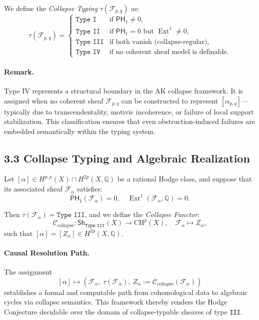 \documentclass[11pt]{article}
\DeclareMathOperator{\Ext}{Ext}
\begin{document}
We define the \emph{Collapse Typing} $\tau(\mathcal{F}_{p,q})$ as:
\[
\tau(\mathcal{F}_{p,q}) =
\begin{cases}
\texttt{Type I} & \text{if } \mathsf{PH}_1 \ne 0, \\
\texttt{Type II} & \text{if } \mathsf{PH}_1 = 0 \text{ but } \Ext^1 \ne 0, \\
\texttt{Type III} & \text{if both vanish (collapse-regular)}, \\
\texttt{Type IV} & \text{if no coherent sheaf model is definable.}
\end{cases}
\]

\paragraph{Remark.}
Type IV represents a structural boundary in the AK collapse framework. It is assigned when no coherent sheaf $\mathcal{F}_{p,q}$ can be constructed to represent $[\alpha_{p,q}]$—typically due to transcendentality, motivic incoherence, or failure of local support stabilization. This classification ensures that even obstruction-induced failures are embedded semantically within the typing system.

\subsection{3.3 Collapse Typing and Algebraic Realization}

Let $[\alpha] \in H^{p,p}(X) \cap H^{2p}(X, \mathbb{Q})$ be a rational Hodge class, and suppose that its associated sheaf $\mathcal{F}_\alpha$ satisfies:
\[
\mathsf{PH}_1(\mathcal{F}_\alpha) = 0, \quad \Ext^1(\mathcal{F}_\alpha, \mathbb{Q}) = 0.
\]

Then $\tau(\mathcal{F}_\alpha) = \texttt{Type III}$, and we define the \emph{Collapse Functor}:
\[
\mathcal{C}_{\text{collapse}} : \mathsf{Sh}_{\texttt{Type III}}(X) \longrightarrow \mathrm{CH}^p(X),
\quad \mathcal{F}_\alpha \mapsto Z_\alpha,
\]
such that $[\alpha] = [Z_\alpha] \in H^{2p}(X, \mathbb{Q})$.

\paragraph{Causal Resolution Path.}
The assignment
\[
[\alpha] \mapsto \left( \mathcal{F}_\alpha,\ \tau(\mathcal{F}_\alpha),\ Z_\alpha := \mathcal{C}_{\text{collapse}}(\mathcal{F}_\alpha) \right)
\]
establishes a formal and computable path from cohomological data to algebraic cycles via collapse semantics. This framework thereby renders the Hodge Conjecture decidable over the domain of collapse-typable sheaves of type \texttt{III}.
\end{document}

